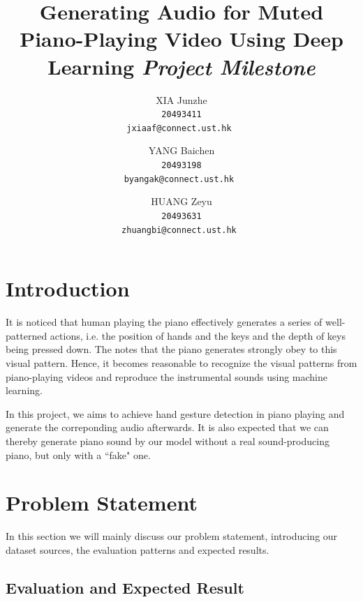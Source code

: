 \documentclass[10pt,twocolumn,letterpaper]{article}
\begin{document}
\title{Generating Audio for Muted Piano-Playing Video Using Deep Learning \newline \newline \textit{Project Milestone}}


\author{XIA Junzhe\\
\tt\small 20493411\\
{\tt\small jxiaaf@connect.ust.hk}
\and
YANG Baichen\\
\tt\small 20493198\\
{\tt\small byangak@connect.ust.hk}
\and
HUANG Zeyu\\
\tt\small 20493631\\
{\tt\small zhuangbi@connect.ust.hk}
}


\maketitle

\section{Introduction}

It is noticed that human playing the piano effectively generates a series of well-patterned actions,
i.e. the position of hands and the keys and the depth of keys being pressed down.
The notes that the piano generates strongly obey to this visual pattern.
Hence, it becomes reasonable to recognize the visual patterns from piano-playing videos and reproduce the instrumental sounds using machine learning.

In this project, we aims to achieve hand gesture detection in piano playing and generate the correponding audio afterwards.
It is also expected that we can thereby generate piano sound by our model without a real sound-producing piano, but only with a ``fake" one.

\section{Problem Statement}
In this section we will mainly discuss our problem statement, introducing our dataset sources, the evaluation patterns and expected results.

\subsection{Evaluation and Expected Result}
\end{document}
